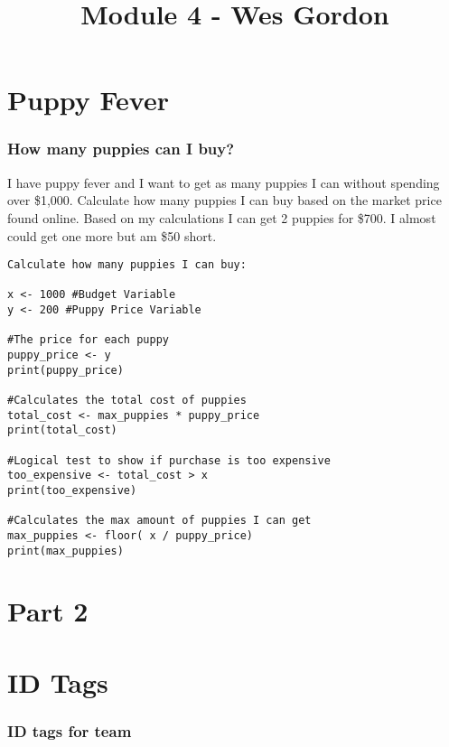 \documentclass[]{article}
\title{Module 4 - Wes Gordon}
\author{}
\date{\vspace{-2.5em}}
\begin{document}
\maketitle

\section{Puppy Fever}\label{puppy-fever}

\subsubsection{How many puppies can I
buy?}\label{how-many-puppies-can-i-buy}

I have puppy fever and I want to get as many puppies I can without
spending over \$1,000. Calculate how many puppies I can buy based on the
market price found online. Based on my calculations I can get 2 puppies
for \$700. I almost could get one more but am \$50 short.

\begin{verbatim}
Calculate how many puppies I can buy:

x <- 1000 #Budget Variable
y <- 200 #Puppy Price Variable

#The price for each puppy
puppy_price <- y 
print(puppy_price)

#Calculates the total cost of puppies
total_cost <- max_puppies * puppy_price 
print(total_cost)

#Logical test to show if purchase is too expensive
too_expensive <- total_cost > x 
print(too_expensive)
  
#Calculates the max amount of puppies I can get      
max_puppies <- floor( x / puppy_price) 
print(max_puppies)
\end{verbatim}

\section{Part 2}\label{part-2}

\section{ID Tags}\label{id-tags}

\subsubsection{ID tags for team}\label{id-tags-for-team}
\end{document}
